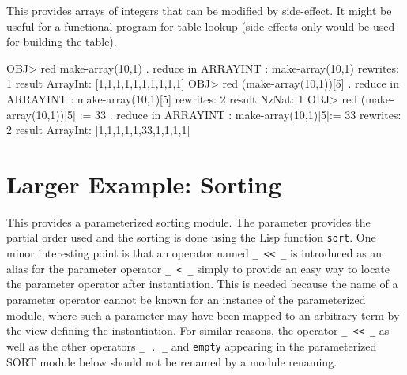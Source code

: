This provides arrays of integers that can be modified by side-effect.
It might be useful for a functional program for table-lookup (side-effects
only would be used for building the table).



\bobj
OBJ> red make-array(10,1) .
reduce in ARRAYINT : make-array(10,1)
rewrites: 1
result ArrayInt: [1,1,1,1,1,1,1,1,1,1]
OBJ> red (make-array(10,1))[5] .
reduce in ARRAYINT : make-array(10,1)[5]
rewrites: 2
result NzNat: 1
OBJ> red (make-array(10,1))[5] := 33 .
reduce in ARRAYINT : make-array(10,1)[5]:= 33
rewrites: 2
result ArrayInt: [1,1,1,1,1,33,1,1,1,1]
\eobj

\section{Larger Example: Sorting}

This provides a parameterized sorting module.  The parameter provides
the partial order used and the sorting is done using the Lisp function
{\tt sort}.  One minor interesting point is that an operator named
{\tt \_ << \_} is introduced as an alias for the parameter operator
{\tt \_ < \_} simply to provide an easy way to locate the parameter operator
after instantiation.  This is needed because
the
name of a parameter operator
cannot be known for an instance of the parameterized module, where such
a parameter may have been mapped to an arbitrary term by the view defining
the instantiation.  For similar reasons, the operator {\tt \_ << \_}
as well as the other operators {\tt \_ , \_} and {\tt empty} appearing
in the parameterized SORT module below should not be renamed by a module
renaming.

